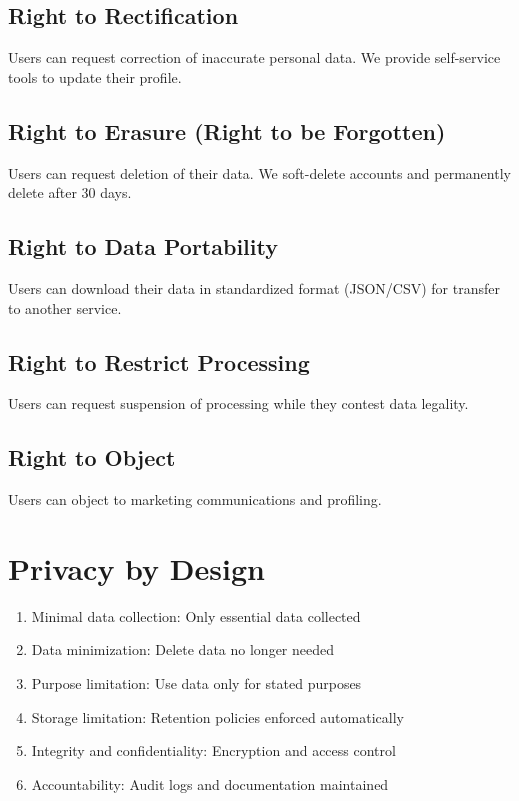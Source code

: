\documentclass{report}
\begin{document}
\subsection{Right to Rectification}
Users can request correction of inaccurate personal data. We provide self-service tools to update their profile.

\subsection{Right to Erasure (Right to be Forgotten)}
Users can request deletion of their data. We soft-delete accounts and permanently delete after 30 days.

\subsection{Right to Data Portability}
Users can download their data in standardized format (JSON/CSV) for transfer to another service.

\subsection{Right to Restrict Processing}
Users can request suspension of processing while they contest data legality.

\subsection{Right to Object}
Users can object to marketing communications and profiling.

\section{Privacy by Design}

\begin{enumerate}
\item Minimal data collection: Only essential data collected
\item Data minimization: Delete data no longer needed
\item Purpose limitation: Use data only for stated purposes
\item Storage limitation: Retention policies enforced automatically
\item Integrity and confidentiality: Encryption and access control
\item Accountability: Audit logs and documentation maintained
\end{enumerate}
\end{document}
